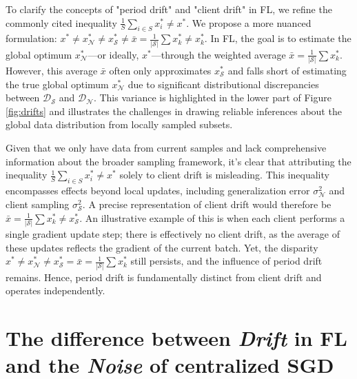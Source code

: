 To clarify the concepts of "period drift" and "client drift" in FL, we refine the commonly cited inequality \(\frac{1}{S}\sum_{i \in S}x_i^* \neq x^*\). We propose a more nuanced formulation: \(x^* \neq x_{\mathcal{N}}^* \neq x_{\mathcal{S}}^* \neq \bar{x} = \frac{1}{|\mathcal{S}|}\sum x_k^* \neq x_k^*\). 
In FL, the goal is to estimate the global optimum \(x^*_{\mathcal{N}}\)—or ideally, \(x^*\)—through the weighted average \(\bar{x} = \frac{1}{|\mathcal{S}|}\sum x_k^*\). However, this average \(\bar{x}\) often only approximates \(x^*_{\mathcal{S}}\) and falls short of estimating the true global optimum \(x^*_{\mathcal{N}}\) due to significant distributional discrepancies between \(\mathcal{D}_{\mathcal{S}}\) and \(\mathcal{D}_{\mathcal{N}}\). This variance is highlighted in the lower part of Figure \ref{fig:drifts} and illustrates the challenges in drawing reliable inferences about the global data distribution from locally sampled subsets.


Given that we only have data from current samples and lack comprehensive information about the broader sampling framework, it's clear that attributing the inequality \(\frac{1}{S}\sum_{i \in S}x_i^* \neq x^*\) solely to client drift is misleading. This inequality encompasses effects beyond local updates, including generalization error \(\sigma_{\mathcal{N}}^2\) and client sampling \(\sigma_{\mathcal{S}}^2\). 
A precise representation of client drift would therefore be \(\bar{x} = \frac{1}{|\mathcal{S}|}\sum x_k^* \neq x_{\mathcal{S}}^*\). An illustrative example of this is when each client performs a single gradient update step; there is effectively no client drift, as the average of these updates reflects the gradient of the current batch. Yet, the disparity \(x^* \neq x_{\mathcal{N}}^* \neq x_{\mathcal{S}}^* = \bar{x} = \frac{1}{|\mathcal{S}|}\sum x_k^*\) still persists, and the influence of period drift remains. Hence, period drift is fundamentally distinct from client drift and operates independently.



\section{The difference between \textit{Drift} in FL and the \textit{Noise} of centralized SGD}\label{appdx:analogy}

